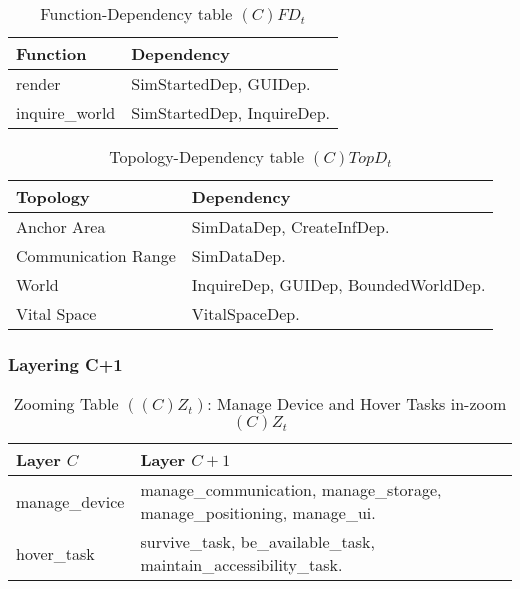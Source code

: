 \begin{table}[H]
	\centering
	\begin{tabular}{|p{5cm}|p{7cm}|}
			\hline
			\textbf{Function} & \textbf{Dependency} \\
			\hline
			render & SimStartedDep, GUIDep. \\
			\hline
			inquire\_world & SimStartedDep, InquireDep. \\
			\hline
		\end{tabular}
	\caption{Function-Dependency table $(C)FD_t$}
	\label{tab:cfdt}
\end{table}

\begin{table}[H]
	\centering
	\begin{tabular}{|p{4cm}|p{8cm}|}
			\hline
			\textbf{Topology} & \textbf{Dependency} \\
			\hline
			Anchor Area & SimDataDep, CreateInfDep.\\
			\hline
			Communication Range & SimDataDep. \\
			\hline
			World & InquireDep, GUIDep, BoundedWorldDep. \\
			\hline
			Vital Space & VitalSpaceDep. \\
			\hline
		\end{tabular}
	\caption{Topology-Dependency table $(C)TopD_t$}
	\label{tab:ctopdt}
\end{table}

\subsubsection{Layering C+1}

\begin{table}[H]
	\centering
	\begin{tabular}{|p{4cm}|p{8cm}|}
			\hline
			\textbf{Layer $C$} & \textbf{Layer $C+1$} \\
			\hline
			manage\_device & manage\_communication, manage\_storage, manage\_positioning,
			manage\_ui. \\
			\hline
			hover\_task & survive\_task, be\_available\_task,
			maintain\_accessibility\_task. \\
			\hline
		\end{tabular}
	\caption{Zooming Table $\left( \left( C \right)Z_t \right)$: Manage
	Device and Hover Tasks in-zoom $(C)Z_t$}
	\label{tab:czt}
\end{table}

